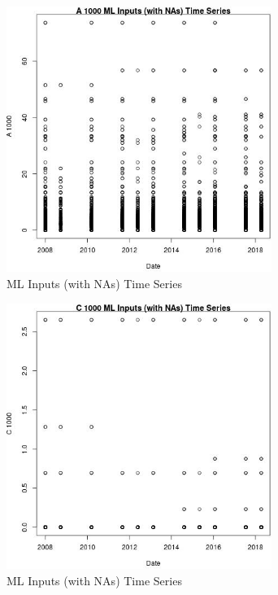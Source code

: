 \begin{figure} 
\centering  
\includegraphics[width=0.77\textwidth]{Code_Outputs/Report_ML_input_PM25_Step4_part_e_de_duplicated_aves_compiled_2019-05-18wNAs_A_1000vDate.jpg} 
\caption{\label{fig:Report_ML_input_PM25_Step4_part_e_de_duplicated_aves_compiled_2019-05-18wNAsA_1000vDate}ML Inputs (with NAs) Time Series} 
\end{figure} 
 

\clearpage 

\begin{figure} 
\centering  
\includegraphics[width=0.77\textwidth]{Code_Outputs/Report_ML_input_PM25_Step4_part_e_de_duplicated_aves_compiled_2019-05-18wNAs_C_1000vDate.jpg} 
\caption{\label{fig:Report_ML_input_PM25_Step4_part_e_de_duplicated_aves_compiled_2019-05-18wNAsC_1000vDate}ML Inputs (with NAs) Time Series} 
\end{figure} 
 


